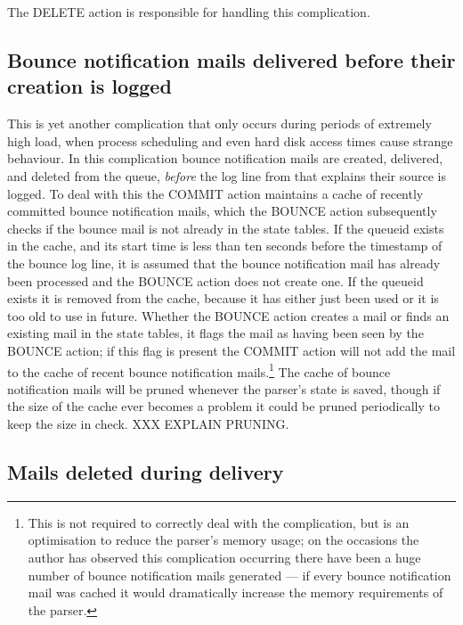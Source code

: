 The DELETE action is responsible for handling this complication.

\subsection{Bounce notification mails delivered before their creation is
logged}

\label{Bounce notification mails delivered before their creation is logged}

This is yet another complication that only occurs during periods of
extremely high load, when process scheduling and even hard disk access
times cause strange behaviour.  In this complication bounce notification
mails are created, delivered, and deleted from the queue, \textit{before\/}
the log line from  that explains their source is logged.  To
deal with this the COMMIT action maintains a cache of recently committed
bounce notification mails, which the BOUNCE action subsequently checks if
the bounce mail is not already in the state tables. If the queueid exists
in the cache, and its start time is less than ten seconds before the
timestamp of the bounce log line, it is assumed that the bounce
notification mail has already been processed and the BOUNCE action does not
create one.  If the queueid exists it is removed from the cache, because it
has either just been used or it is too old to use in future.  Whether the
BOUNCE action creates a mail or finds an existing mail in the state tables,
it flags the mail as having been seen by the BOUNCE action; if this flag is
present the COMMIT action will not add the mail to the cache of recent
bounce notification mails.\footnote{This is not required to correctly deal
with the complication, but is an optimisation to reduce the parser's memory
usage; on the occasions the author has observed this complication occurring
there have been a huge number of bounce notification mails generated --- if
every bounce notification mail was cached it would dramatically increase
the memory requirements of the parser.}  The cache of bounce notification
mails will be pruned whenever the parser's state is saved, though if the
size of the cache ever becomes a problem it could be pruned periodically to
keep the size in check.  XXX EXPLAIN PRUNING\@.

\subsection{Mails deleted during delivery}

